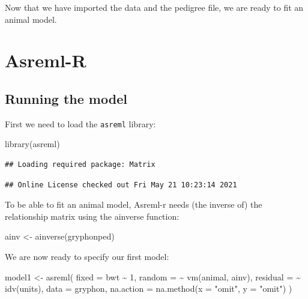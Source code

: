 \documentclass[
  12pt,
]{book}
\newenvironment{Shaded}{\begin{snugshade}}{\end{snugshade}}
\newcommand{\AttributeTok}[1]{\textcolor[rgb]{0.77,0.63,0.00}{#1}}
\newcommand{\DecValTok}[1]{\textcolor[rgb]{0.00,0.00,0.81}{#1}}
\newcommand{\FunctionTok}[1]{\textcolor[rgb]{0.00,0.00,0.00}{#1}}
\newcommand{\NormalTok}[1]{#1}
\newcommand{\OtherTok}[1]{\textcolor[rgb]{0.56,0.35,0.01}{#1}}
\newcommand{\SpecialCharTok}[1]{\textcolor[rgb]{0.00,0.00,0.00}{#1}}
\newcommand{\StringTok}[1]{\textcolor[rgb]{0.31,0.60,0.02}{#1}}
\begin{document}
Now that we have imported the data and the pedigree file, we are ready to fit an animal model.

\hypertarget{asreml-r-1}{%
\section{Asreml-R}\label{asreml-r-1}}

\hypertarget{running-the-model}{%
\subsection{Running the model}\label{running-the-model}}

First we need to load the \texttt{asreml} library:

\begin{Shaded}
\begin{Highlighting}[]
\FunctionTok{library}\NormalTok{(asreml)}
\end{Highlighting}
\end{Shaded}

\begin{verbatim}
## Loading required package: Matrix
\end{verbatim}

\begin{verbatim}
## Online License checked out Fri May 21 10:23:14 2021
\end{verbatim}

To be able to fit an animal model, Asreml-r needs (the inverse of) the relationship matrix using the ainverse function:

\begin{Shaded}
\begin{Highlighting}[]
\NormalTok{ainv }\OtherTok{\textless{}{-}} \FunctionTok{ainverse}\NormalTok{(gryphonped)}
\end{Highlighting}
\end{Shaded}

We are now ready to specify our first model:

\begin{Shaded}
\begin{Highlighting}[]
\NormalTok{model1 }\OtherTok{\textless{}{-}} \FunctionTok{asreml}\NormalTok{(}
  \AttributeTok{fixed =}\NormalTok{ bwt }\SpecialCharTok{\textasciitilde{}} \DecValTok{1}\NormalTok{, }\AttributeTok{random =} \SpecialCharTok{\textasciitilde{}} \FunctionTok{vm}\NormalTok{(animal, ainv),}
  \AttributeTok{residual =} \SpecialCharTok{\textasciitilde{}} \FunctionTok{idv}\NormalTok{(units),}
  \AttributeTok{data =}\NormalTok{ gryphon,}
  \AttributeTok{na.action =} \FunctionTok{na.method}\NormalTok{(}\AttributeTok{x =} \StringTok{"omit"}\NormalTok{, }\AttributeTok{y =} \StringTok{"omit"}\NormalTok{)}
\NormalTok{)}
\end{Highlighting}
\end{Shaded}
\end{document}
